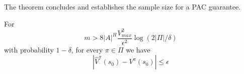 The theorem concludes and establishes the sample size for a PAC
guarantee.
\begin{theorem}
For
\[
m> 8|A|^{H}\frac{V^2_{max}}{\epsilon^2}\log(2|\Pi|/\delta)
\]
with probability $1-\delta$, for every $\pi\in \Pi$ we have
\[
|\hat{V}^\pi (s_0)-V^\pi(s_0)|\leq \epsilon
\]
\end{theorem}



















%
